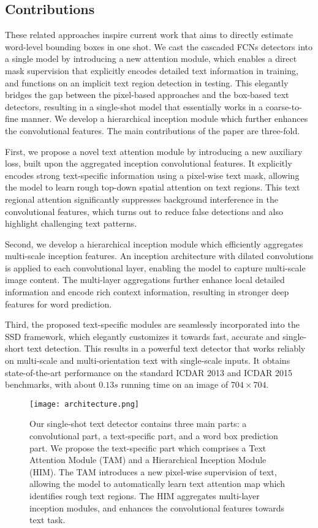 \documentclass[10pt,twocolumn,letterpaper]{article}
\begin{document}
\subsection{Contributions}
These related approaches inspire current work that aims to directly estimate word-level bounding boxes in one shot. We cast the cascaded FCNs detectors into a single model by introducing a new attention module, which enables a direct mask supervision that explicitly encodes detailed text information in training, and functions on an implicit text region detection in testing. This elegantly bridges the gap between the pixel-based approaches and the box-based text detectors,  resulting in a single-shot model that essentially works in a coarse-to-fine manner. We develop a hierarchical inception module which further enhances the convolutional features. The main contributions of the paper are three-fold.

First, we propose a novel text attention module by introducing a new auxiliary loss, built upon the aggregated inception convolutional features. It explicitly  encodes strong text-specific information using a pixel-wise text mask, allowing the model to learn rough top-down
spatial attention on text regions. This text regional attention significantly suppresses background interference in the convolutional features, which turns out to reduce false detections and also highlight challenging text patterns.

Second, we develop a hierarchical inception module which efficiently aggregates multi-scale inception features. An inception architecture with dilated convolutions \cite{Yu2016}  is applied to each convolutional layer, enabling the model to capture multi-scale image content. The multi-layer aggregations further enhance local detailed information and encode rich context information, resulting in stronger deep features for word prediction.

Third, the proposed text-specific modules are seamlessly incorporated into the SSD framework, which elegantly customizes it towards fast, accurate and single-short text detection.  This results in a powerful text detector that works reliably on multi-scale and multi-orientation text with single-scale inputs. It obtains state-of-the-art performance on the standard ICDAR 2013 and ICDAR 2015 benchmarks, with about $0.13s$ running time on an image of $704 \times 704$.

\begin{figure*}
   \centering
   \texttt{[image: architecture.png]}
   \caption{Our single-shot text detector contains three main parts: a convolutional part, a text-specific part, and a word box prediction part. We propose the text-specific part which comprises a Text Attention Module (TAM) and a Hierarchical Inception Module (HIM). The TAM introduces a new pixel-wise supervision of text, allowing the model to automatically learn text attention map which identifies rough text regions. The HIM aggregates multi-layer inception modules, and enhances the convolutional features towards text task.}
   \label{fig:architecture}
\end{figure*}
\end{document}
